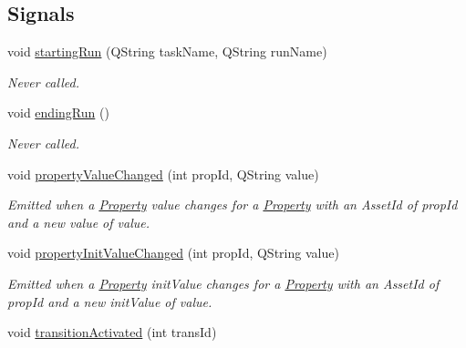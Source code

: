 \subsection*{Signals}
\begin{DoxyCompactItemize}
\item 
void \hyperlink{class_picto_1_1_remote_state_updater_a42d155b768af1abb903eebd4bd84139a}{starting\-Run} (Q\-String task\-Name, Q\-String run\-Name)
\begin{DoxyCompactList}\small\item\em Never called. \end{DoxyCompactList}\item 
void \hyperlink{class_picto_1_1_remote_state_updater_a15af514c65234a1837012ec884561505}{ending\-Run} ()
\begin{DoxyCompactList}\small\item\em Never called. \end{DoxyCompactList}\item 
\hypertarget{class_picto_1_1_remote_state_updater_a130d471db538e01ec3a549b429772012}{void \hyperlink{class_picto_1_1_remote_state_updater_a130d471db538e01ec3a549b429772012}{property\-Value\-Changed} (int prop\-Id, Q\-String value)}\label{class_picto_1_1_remote_state_updater_a130d471db538e01ec3a549b429772012}

\begin{DoxyCompactList}\small\item\em Emitted when a \hyperlink{class_picto_1_1_property}{Property} value changes for a \hyperlink{class_picto_1_1_property}{Property} with an Asset\-Id of prop\-Id and a new value of value. \end{DoxyCompactList}\item 
\hypertarget{class_picto_1_1_remote_state_updater_a928e83724f5aed13e45817c581dd4d16}{void \hyperlink{class_picto_1_1_remote_state_updater_a928e83724f5aed13e45817c581dd4d16}{property\-Init\-Value\-Changed} (int prop\-Id, Q\-String value)}\label{class_picto_1_1_remote_state_updater_a928e83724f5aed13e45817c581dd4d16}

\begin{DoxyCompactList}\small\item\em Emitted when a \hyperlink{class_picto_1_1_property}{Property} init\-Value changes for a \hyperlink{class_picto_1_1_property}{Property} with an Asset\-Id of prop\-Id and a new init\-Value of value. \end{DoxyCompactList}\item 
\hypertarget{class_picto_1_1_remote_state_updater_a86702871a23abf704f4954f40531a20e}{void \hyperlink{class_picto_1_1_remote_state_updater_a86702871a23abf704f4954f40531a20e}{transition\-Activated} (int trans\-Id)}\label{class_picto_1_1_remote_state_updater_a86702871a23abf704f4954f40531a20e}


\end{DoxyCompactItemize}
